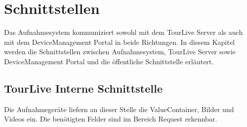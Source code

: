 \chapter{Schnittstellen}

Das Aufnahmesystem kommuniziert sowohl mit dem TourLive Server  als auch mit dem DeviceManagement Portal in beide Richtungen. In diesem Kapitel werden die Schnittstellen zwischen Aufnahmesystem, TourLive Server sowie DeviceManagement Portal und die öffentliche Schnittstelle erläutert.

\section{TourLive Interne Schnittstelle}
\label{sec:tourliveserverapi}
Die Aufnahmegeräte liefern an dieser Stelle die ValueContainer, Bilder und Videos ein. Die benötigten Felder sind im Bereich Request erkennbar.
